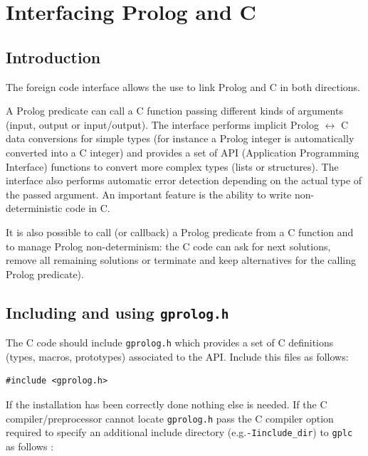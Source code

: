 \newpage
\section{Interfacing Prolog and C}
\label{Interfacing-Prolog-and-C}

\subsection{Introduction}

The foreign code interface allows the use to link Prolog and C in both
directions.

A Prolog predicate can call a C function passing different kinds of arguments
(input, output or input/output). The interface performs implicit Prolog
$\leftrightarrow$ C data conversions for simple types (for instance a Prolog
integer is automatically converted into a C integer) and provides a set of
API (Application Programming Interface) functions to convert more complex
types (lists or structures). The interface also performs automatic error
detection depending on the actual type of the passed argument. An important
feature is the ability to write non-deterministic code in C.

It is also possible to call (or callback) a Prolog predicate from a C
function and to manage Prolog non-determinism: the C code can ask for next
solutions, remove all remaining solutions or terminate and keep
alternatives for the calling Prolog predicate).

\subsection{Including and using \texttt{gprolog.h}}

The C code should include \texttt{gprolog.h} which provides a set of C
definitions (types, macros, prototypes) associated to the API. Include this
files as follows:

\begin{Code}
\begin{verbatim}
#include <gprolog.h>
\end{verbatim}
\end{Code}

If the installation has been correctly done nothing else is needed. If the C
compiler/preprocessor cannot locate \texttt{gprolog.h} pass the C compiler
option required to specify an additional include directory
(e.g.\texttt{-I}\texttt{include\_dir}) to \texttt{gplc} as follows
:


